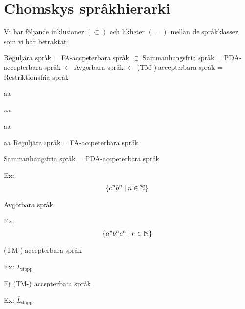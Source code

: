 \section{Chomskys språkhierarki}\par
\noindent Vi har följande inklusioner $(\subset)$ och likheter $(=)$ mellan de språkklasser som vi har betraktat:
\par\bigskip
Reguljära språk = FA-accpeterbara språk $\subset$ Sammanhangsfria språk = PDA-accepterbara språk $\subset$ Avgörbara språk $\subset$ (TM-) accepterbara språk = Restriktionsfria språk
\par\bigskip
\begin{tst}
  aa
  \begin{tst}
    aa
    \begin{tst}
      aa
      \begin{tst}
        aa
        Reguljära språk = FA-accpeterbara språk
      \end{tst}
      \par\bigskip
      Sammanhangsfria språk = PDA-accpeterbara språk\par
      Ex:
      \begin{equation*}
        \begin{gathered}
          \left\{a^nb^n\:|\: n\in\mathbb{N}\right\}
        \end{gathered}
      \end{equation*}
    \end{tst}
    \par\bigskip
    Avgörbara språk\par
    Ex:
    \begin{equation*}
      \begin{gathered}
        \left\{a^nb^nc^n\:|\: n\in\mathbb{N}\right\}
      \end{gathered}
    \end{equation*}
  \end{tst}
  \par\bigskip
  (TM-) accepterbara språk\par
  Ex: $L_{\text{stopp}}$
\end{tst}
\par\bigskip
Ej (TM-) accepterbara språk\par
Ex: $\overline{L}_{\text{stopp}}$
